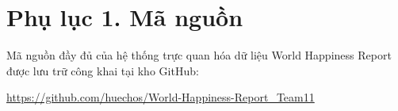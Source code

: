 \appendix
{}

\section*{Phụ lục 1. Mã nguồn}

Mã nguồn đầy đủ của hệ thống trực quan hóa dữ liệu World Happiness Report được lưu trữ công khai tại kho GitHub:

\begin{center}
\large
\href{https://github.com/huechos/World-Happiness-Report_Team11}{https://github.com/huechos/World-Happiness-Report\_Team11}
\end{center}


